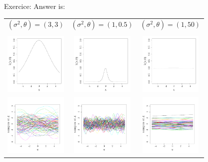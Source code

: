\documentclass{beamer}
\begin{document}
\begin{frame}{}
\begin{exampleblock}{Exercice: }
Answer is:
\begin{center}
\begin{tabular}{ccc}
$(\sigma^2,\theta) = (3,3)$& $(\sigma^2,\theta)=(1,0.5)$& $(\sigma^2,\theta)=(1,50)$ \\ 
&&\\
\includegraphics[height=3cm]{figures/R/MVN_kern33} &\includegraphics[height=3cm]{figures/R/MVN_kern105}& \includegraphics[height=3cm]{figures/R/MVN_kern150}\\ 
\includegraphics[height=3cm]{figures/R/MVN_traj33} &\includegraphics[height=3cm]{figures/R/MVN_traj105}& \includegraphics[height=3cm]{figures/R/MVN_traj150}
\end{tabular}
\end{center}
\end{exampleblock}
\end{frame}
\end{document}
